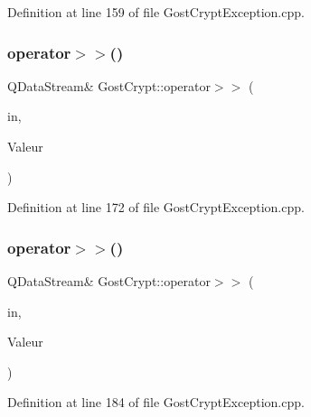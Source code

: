 Definition at line 159 of file Gost\+Crypt\+Exception.\+cpp.

\mbox{\label{namespace_gost_crypt_ab1418c707af012e32eda56005e2d8d35}} 
\subsubsection{\texorpdfstring{operator$>$$>$()}{operator>>()}\hspace{0.1cm}{\footnotesize\ttfamily [10/13]}}
{\footnotesize\ttfamily Q\+Data\+Stream\& Gost\+Crypt\+::operator$>$$>$ (\begin{DoxyParamCaption}\item[{Q\+Data\+Stream \&}]{in,  }\item[{\hyperlink{class_gost_crypt_1_1_failed_memory_allocation}{Gost\+Crypt\+::\+Failed\+Memory\+Allocation} \&}]{Valeur }\end{DoxyParamCaption})}



Definition at line 172 of file Gost\+Crypt\+Exception.\+cpp.

\mbox{\label{namespace_gost_crypt_a9b8913a36f6eb5c828e321facd702cba}} 
\subsubsection{\texorpdfstring{operator$>$$>$()}{operator>>()}\hspace{0.1cm}{\footnotesize\ttfamily [11/13]}}
{\footnotesize\ttfamily Q\+Data\+Stream\& Gost\+Crypt\+::operator$>$$>$ (\begin{DoxyParamCaption}\item[{Q\+Data\+Stream \&}]{in,  }\item[{\hyperlink{class_gost_crypt_1_1_unknow_exception}{Gost\+Crypt\+::\+Unknow\+Exception} \&}]{Valeur }\end{DoxyParamCaption})}



Definition at line 184 of file Gost\+Crypt\+Exception.\+cpp.

\mbox{\label{namespace_gost_crypt_a38f38fdf8080ca24432ed4dec70ac603}} 
